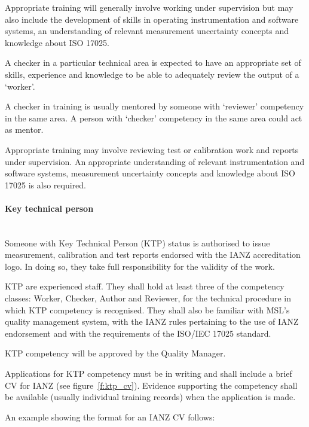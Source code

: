 Appropriate training will generally involve working under supervision but may also include the development of skills in operating instrumentation and software systems, an understanding of relevant measurement uncertainty concepts and knowledge about ISO 17025.
 
A checker in a particular technical area is expected to have an appropriate set of skills, experience and knowledge to be able to adequately review the output of a ‘worker'.

A checker in training is usually mentored by someone with ‘reviewer' competency in the same area. A person with ‘checker' competency in the same area could act as mentor.

Appropriate training may involve reviewing test or calibration work and reports under supervision. An appropriate understanding of relevant instrumentation and software systems, measurement uncertainty concepts and knowledge about ISO 17025 is also required.

\paragraph{Key technical person} \mbox{}\\
Someone with Key Technical Person (KTP) status is authorised to issue measurement, calibration and test reports endorsed with the IANZ accreditation logo. In doing so, they take full responsibility for the validity of the work.

KTP are experienced staff. They shall hold at least three of the competency classes: Worker, Checker, Author and Reviewer, for the technical procedure in which KTP competency is recognised. They shall also be familiar with MSL’s quality management system, with the IANZ rules pertaining to the use of IANZ endorsement and with the requirements of the ISO/IEC 17025 standard.  

KTP competency will be approved by the Quality Manager. 

Applications for KTP competency must be in writing and shall include a brief CV for IANZ (see figure~\ref{f:ktp_cv}). Evidence supporting the competency shall be available (usually individual training records) when the application is made.

An example showing the format for an IANZ CV follows:

